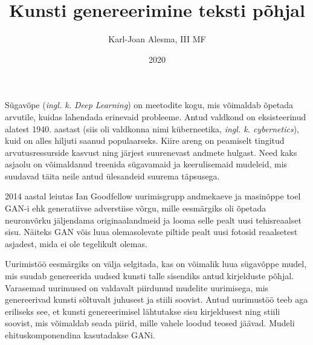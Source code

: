\documentclass{vilgym}
\title{Kunsti genereerimine teksti põhjal}
\author{Karl-Joan Alesma, III MF}
\date{2020}
\begin{document}
	\maketitle
	\tableofcontents

	\newcommand*{\seefig}[1]{(\hyperref[fig:#1]{vt~joonis~\ref{fig:#1}})}
	\newcommand*{\inglk}[1]{(\textit{ingl. k. #1})}

	Sügavõpe \inglk{Deep Learning} on meetodite kogu, mis võimaldab õpetada arvutile, kuidas lahendada erinevaid probleeme. Antud valdkond on eksisteerinud alatest 1940. aastast (siis oli valdkonna nimi küberneetika, \textit{ingl. k. cybernetics}), kuid on alles hiljuti saanud populaarseks. Kiire areng on peamiselt tingitud arvutusressurside kasvust ning järjest suurenevast andmete hulgast. Need kaks asjaolu on võimaldanud treenida sügavamaid ja keerulisemaid mudeleid, mis suudavad täita neile antud ülesandeid suurema täpsusega. \parencite{deeplearningbook}	 


	2014 aastal leiutas Ian Goodfellow uurimisgrupp andmekaeve ja masinõppe toel GAN-i ehk generatiivse adverstiise võrgu, mille eesmärgiks oli õpetada neuronvõrku jäljendama originaalandmeid ja looma selle pealt uusi tehisreaalset sisu. Näiteks GAN võis luua olemasolevate piltide pealt uusi fotosid reaalsetest asjadest, mida ei ole tegelikult olemas. \parencite{gan}

	Uurimistöö eesmärgiks on välja selgitada, kas on võimalik luua sügavõppe mudel, mis suudab genereerida uudsed kunsti talle sisendiks antud kirjelduste põhjal. Varasemad uurimused on valdavalt piirdunud mudelite uurimisega, mis genereerivad kunsti sõltuvalt juhusest ja stiili soovist. Antud uurimustöö teeb aga eriliseks see, et kunsti genereerimisel lähtutakse sisu kirjeldusest ning stiili soovist, mis võimaldab seada piirid, mille vahele loodud teosed jäävad. Mudeli ehituskomponendina kasutadakse GANi.
\end{document}
